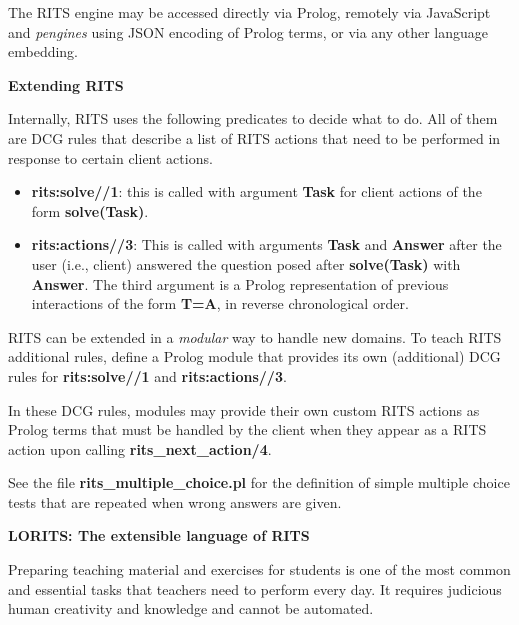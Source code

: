 \documentclass[a4paper,11pt]{article}
\begin{document}
\vspace{0.7cm}

The RITS engine may be accessed directly via Prolog, remotely via
JavaScript and \textit{pengines} using JSON encoding of Prolog terms,
or via any other language embedding.

\bigskip
\begin{center}
  \large\textbf{Extending RITS}
\end{center}

\medskip
\noindent Internally, RITS uses the following predicates to decide
what to do. All of them are DCG rules that describe a list of RITS
actions that need to be performed in response to certain client actions.

\begin{itemize}
\item \textbf{rits:solve//1}: this is called with argument \textbf{Task}
  for client actions of the form \textbf{solve(Task)}.

\item \textbf{rits:actions//3}: This is called with arguments
  \textbf{Task} and \textbf{Answer} after the user (i.e., client)
  answered the question posed after \textbf{solve(Task)} with
  \textbf{Answer}. The third argument is a Prolog representation of
  previous interactions of the form \textbf{T=A}, in reverse
  chronological order.

\end{itemize}

RITS can be extended in a \textit{modular} way to handle new domains.
To teach RITS additional rules, define a Prolog module that provides
its own (additional) DCG rules for \textbf{rits:solve//1} and
\textbf{rits:actions//3}. 

In these DCG rules, modules may provide their own custom RITS actions
as Prolog terms that must be handled by the client when they appear as
a RITS action upon calling \textbf{rits\_next\_action/4}.

See the file \textbf{rits\_multiple\_choice.pl} for the definition of
simple multiple choice tests that are repeated when wrong answers are
given.

\pagebreak

\begin{center}
  \large\textbf{LORITS: The extensible language of RITS}
\end{center}

\medskip
\noindent
Preparing teaching material and exercises for students is one of the
most common and essential tasks that teachers need to perform
every day. It requires judicious human creativity and knowledge and
cannot be automated.
\end{document}
